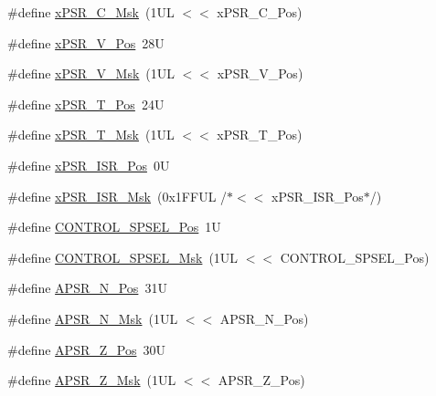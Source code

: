 \begin{DoxyCompactItemize}
\item 
\#define \hyperlink{group___c_m_s_i_s___c_o_r_e_ga21e2497255d380f956ca0f48d11d0775}{x\+P\+S\+R\+\_\+\+C\+\_\+\+Msk}~(1\+U\+L $<$$<$ x\+P\+S\+R\+\_\+\+C\+\_\+\+Pos)
\item 
\#define \hyperlink{group___c_m_s_i_s___c_o_r_e_gae0cfbb394490db402623d97e6a979e00}{x\+P\+S\+R\+\_\+\+V\+\_\+\+Pos}~28U
\item 
\#define \hyperlink{group___c_m_s_i_s___c_o_r_e_gab07f94ed3b6ee695f5af719dc27995c2}{x\+P\+S\+R\+\_\+\+V\+\_\+\+Msk}~(1\+U\+L $<$$<$ x\+P\+S\+R\+\_\+\+V\+\_\+\+Pos)
\item 
\#define \hyperlink{group___c_m_s_i_s___c_o_r_e_ga98d801da9a49cda944f52aeae104dd38}{x\+P\+S\+R\+\_\+\+T\+\_\+\+Pos}~24U
\item 
\#define \hyperlink{group___c_m_s_i_s___c_o_r_e_ga30ae2111816e82d47636a8d4577eb6ee}{x\+P\+S\+R\+\_\+\+T\+\_\+\+Msk}~(1\+U\+L $<$$<$ x\+P\+S\+R\+\_\+\+T\+\_\+\+Pos)
\item 
\#define \hyperlink{group___c_m_s_i_s___c_o_r_e_ga21bff245fb1aef9683f693d9d7bb2233}{x\+P\+S\+R\+\_\+\+I\+S\+R\+\_\+\+Pos}~0U
\item 
\#define \hyperlink{group___c_m_s_i_s___c_o_r_e_gadf8eed87e0081dfe1ef1c78a0ea91afd}{x\+P\+S\+R\+\_\+\+I\+S\+R\+\_\+\+Msk}~(0x1\+F\+F\+U\+L /$\ast$$<$$<$ x\+P\+S\+R\+\_\+\+I\+S\+R\+\_\+\+Pos$\ast$/)
\item 
\#define \hyperlink{group___c_m_s_i_s___c_o_r_e_ga07eafc53e609895342c6a530e9d01310}{C\+O\+N\+T\+R\+O\+L\+\_\+\+S\+P\+S\+E\+L\+\_\+\+Pos}~1U
\item 
\#define \hyperlink{group___c_m_s_i_s___c_o_r_e_ga70b29840969b06909da21369b0b05b53}{C\+O\+N\+T\+R\+O\+L\+\_\+\+S\+P\+S\+E\+L\+\_\+\+Msk}~(1\+U\+L $<$$<$ C\+O\+N\+T\+R\+O\+L\+\_\+\+S\+P\+S\+E\+L\+\_\+\+Pos)
\item 
\#define \hyperlink{group___c_m_s_i_s___c_o_r_e_gac469528d210043c7bd3f12f0e6824766}{A\+P\+S\+R\+\_\+\+N\+\_\+\+Pos}~31U
\item 
\#define \hyperlink{group___c_m_s_i_s___c_o_r_e_gadbc2cf55a026f661b53fadfcf822cef1}{A\+P\+S\+R\+\_\+\+N\+\_\+\+Msk}~(1\+U\+L $<$$<$ A\+P\+S\+R\+\_\+\+N\+\_\+\+Pos)
\item 
\#define \hyperlink{group___c_m_s_i_s___c_o_r_e_ga3661286d108b1aca308d7445685eae3a}{A\+P\+S\+R\+\_\+\+Z\+\_\+\+Pos}~30U
\item 
\#define \hyperlink{group___c_m_s_i_s___c_o_r_e_ga1deb4d1aa72bb83d1f79329406f15711}{A\+P\+S\+R\+\_\+\+Z\+\_\+\+Msk}~(1\+U\+L $<$$<$ A\+P\+S\+R\+\_\+\+Z\+\_\+\+Pos)
\item 

\end{DoxyCompactItemize}
